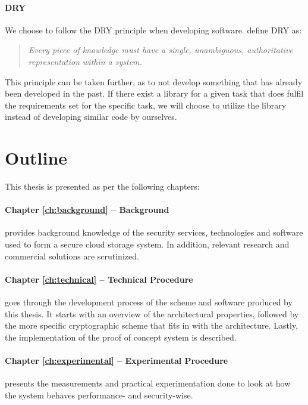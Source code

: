 \documentclass[pdftex,english,10pt,b5paper,twoside]{book}
\begin{document}
\paragraph{DRY} We choose to follow the \ac{DRY} principle when developing
software. \citet{dry} define \ac{DRY} as:

\begin{quote}\it
Every piece of knowledge must have a single, unambiguous, authoritative
representation within a system.
\end{quote}

\noindent This principle can be taken further, as to not develop something that
has already been developed in the past. If there exist a library for a given
task that does fulfil the requirements set for the specific task, we will
choose to utilize the library instead of developing similar code by ourselves.

\section{Outline}

This thesis is presented as per the following chapters:

\paragraph{Chapter \ref{ch:background} -- Background} provides background
knowledge of the security services, technologies and software used to form a
secure cloud storage system. In addition, relevant research and commercial
solutions are scrutinized.

\paragraph{Chapter \ref{ch:technical} -- Technical Procedure} goes through the
development process of the scheme and software produced by this thesis. It
starts with an overview of the architectural properties, followed by the more
specific cryptographic scheme that fits in with the architecture. Lastly, the
implementation of the proof of concept system is described.

\paragraph{Chapter \ref{ch:experimental} -- Experimental Procedure} presents
the measurements and practical experimentation done to look at how the system
behaves performance- and security-wise.
\end{document}
